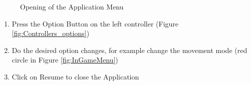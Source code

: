 \documentclass[notitlepage]{article}
\begin{document}
\begin{figure}[H]
   \centering
    \quad
    \caption{Opening of the Application Menu}\label{fig:UI-Interaction}%
\end{figure}

\qquad
\begin{enumerate}
\item Press the Option Button on the left controller (Figure \ref{fig:Controllers_options}) \\
\item Do the desired option changes, for example change the movement mode (red circle in Figure \ref{fig:InGameMenu})\\
\item Click on Resume to close the Application
\end{enumerate}  
\end{document}
